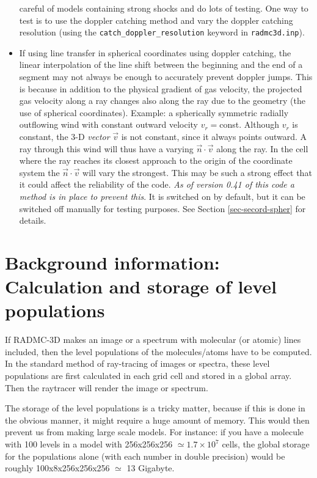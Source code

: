 \documentclass{report}
\begin{document}
\begin{itemize}
  careful of models containing strong shocks and do lots of testing.  One
  way to test is to use the doppler catching method and vary the doppler
  catching resolution (using the {\small\tt catch\_doppler\_resolution}
  keyword in {\small\tt radmc3d.inp}).
\item If using line transfer in spherical coordinates using doppler
  catching, the linear interpolation of the line shift between the beginning
  and the end of a segment may not always be enough to accurately prevent
  doppler jumps. This is because in addition to the physical gradient of gas
  velocity, the projected gas velocity along a ray changes also along the
  ray due to the geometry (the use of spherical coordinates). Example: a
  spherically symmetric radially outflowing wind with constant outward
  velocity $v_r=$const. Although $v_r$ is constant, the 3-D {\em vector}
  $\vec v$ is not constant, since it always points outward. A ray through
  this wind will thus have a varying $\vec n\cdot \vec v$ along the ray.  In
  the cell where the ray reaches its closest approach to the origin of the
  coordinate system the $\vec n\cdot \vec v$ will vary the strongest.  This
  may be such a strong effect that it could affect the reliability of the
  code. {\em As of version 0.41 of this code a method is in place to prevent
    this}. It is switched on by default, but it can be switched off manually
  for testing purposes. See Section \ref{sec-secord-spher} for details.
\end{itemize}


\section{Background information: Calculation and storage of level populations}
\label{sec-calcstore-levpop}
%
If RADMC-3D makes an image or a spectrum with molecular (or atomic) lines
included, then the level populations of the molecules/atoms have to be
computed. In the standard method of ray-tracing of images or spectra, these
level populations are first calculated in each grid cell and stored in a
global array. Then the raytracer will render the image or spectrum. 

The storage of the level populations is a tricky matter, because if this is
done in the obvious manner, it might require a huge amount of memory. This
would then prevent us from making large scale models. For instance: if you
have a molecule with 100 levels in a model with 256x256x256 $\simeq
1.7\times 10^7$ cells, the global storage for the populations alone (with
each number in double precision) would be roughly 100x8x256x256x256 $\simeq$
13 Gigabyte.
\end{document}
